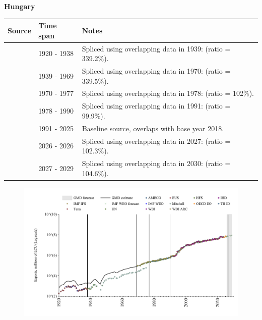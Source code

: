 \documentclass[12pt,a4paper,landscape]{article}
\begin{document}
\begin{adjustbox}{max totalsize={\paperwidth}{\paperheight},center}
\begin{minipage}[t][\textheight][t]{\textwidth}
\vspace*{0.5cm}
{}
\begin{center}
{\Large\bfseries Hungary}
\end{center}
\vspace{0.5cm}
\begin{table}[H]
\centering
\small
\begin{tabular}{|l|l|l|}
\hline
\textbf{Source} & \textbf{Time span} & \textbf{Notes} \\
\hline
\rowcolor{white}\cite{Tena}& 1920 - 1938 &Spliced using overlapping data in 1939: (ratio = 339.2\%).\\
\rowcolor{lightgray}\cite{Mitchell}& 1939 - 1969 &Spliced using overlapping data in 1970: (ratio = 339.5\%).\\
\rowcolor{white}\cite{UN}& 1970 - 1977 &Spliced using overlapping data in 1978: (ratio = 102\%).\\
\rowcolor{lightgray}\cite{AMECO}& 1978 - 1990 &Spliced using overlapping data in 1991: (ratio = 99.9\%).\\
\rowcolor{white}\cite{OECD_EO}& 1991 - 2025 &Baseline source, overlaps with base year 2018.\\
\rowcolor{lightgray}\cite{AMECO}& 2026 - 2026 &Spliced using overlapping data in 2027: (ratio = 102.3\%).\\
\rowcolor{white}\cite{IMF_WEO_forecast}& 2027 - 2029 &Spliced using overlapping data in 2030: (ratio = 104.6\%).\\
\hline
\end{tabular}
\end{table}
\begin{figure}[H]
\centering
\includegraphics[width=\textwidth,height=0.6\textheight,keepaspectratio]{graphs/HUN_exports.pdf}
\end{figure}
\end{minipage}
\end{adjustbox}
\end{document}
